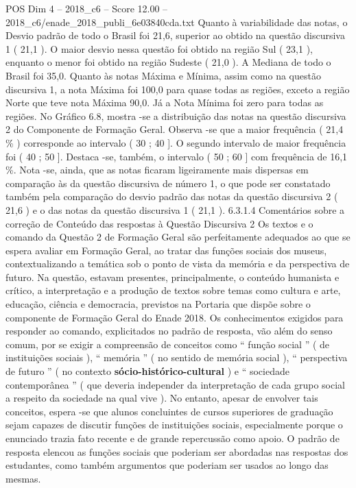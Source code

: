 \begin{textsample}{POS Dim 4 – 2018\_c6 – Score 12.00 – 2018\_c6/enade\_2018\_publi\_6e03840cda.txt}
Quanto à variabilidade das notas, o Desvio padrão de todo o Brasil foi 21,6, superior ao obtido na questão discursiva 1 ( 21,1 ).
O maior desvio nessa questão foi obtido na região Sul ( 23,1 ), enquanto o menor foi obtido na região Sudeste ( 21,0 ).
A Mediana de todo o Brasil foi 35,0.
Quanto às notas Máxima e Mínima, assim como na questão discursiva 1, a nota Máxima foi 100,0 para quase todas as regiões, exceto a região Norte que teve nota Máxima 90,0.
Já a Nota Mínima foi zero para todas as regiões.
No Gráfico 6.8, mostra -se a distribuição das notas na questão discursiva 2 do Componente de Formação Geral.
Observa -se que a maior frequência ( 21,4 \% ) corresponde ao intervalo ( 30 ; 40 ].
O segundo intervalo de maior frequência foi ( 40 ; 50 ].
Destaca -se, também, o intervalo ( 50 ; 60 ] com frequência de 16,1 \%.
Nota -se, ainda, que as notas ficaram ligeiramente mais dispersas em comparação às da questão discursiva de número 1, o que pode ser constatado também pela comparação do desvio padrão das notas da questão discursiva 2 ( 21,6 ) e o das notas da questão discursiva 1 ( 21,1 ). 6.3.1.4 Comentários sobre a correção de Conteúdo das respostas à Questão Discursiva 2 Os textos e o comando da Questão 2 de Formação Geral são perfeitamente adequados ao que se espera avaliar em Formação Geral, ao tratar das funções sociais dos museus, contextualizando a temática sob o ponto de vista da memória e da perspectiva de futuro.
Na questão, estavam presentes, principalmente, o conteúdo humanista e crítico, a interpretação e a produção de textos sobre temas como cultura e arte, educação, ciência e democracia, previstos na Portaria que dispõe sobre o componente de Formação Geral do Enade 2018.
Os conhecimentos exigidos para responder ao comando, explicitados no padrão de resposta, vão além do senso comum, por se exigir a compreensão de conceitos como “ função social ” ( de instituições sociais ), “ memória ” ( no sentido de memória social ), “ perspectiva de futuro ” ( no contexto \textbf{sócio-histórico-cultural} ) e “ sociedade contemporânea ” ( que deveria independer da interpretação de cada grupo social a respeito da sociedade na qual vive ).
No entanto, apesar de envolver tais conceitos, espera -se que alunos concluintes de cursos superiores de graduação sejam capazes de discutir funções de instituições sociais, especialmente porque o enunciado trazia fato recente e de grande repercussão como apoio.
O padrão de resposta elencou as funções sociais que poderiam ser abordadas nas respostas dos estudantes, como também argumentos que poderiam ser usados ao longo das mesmas.

\end{textsample}

